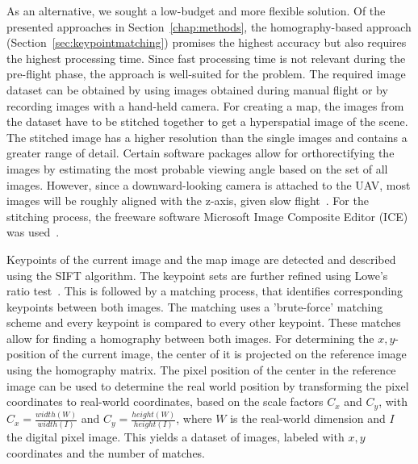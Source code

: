 \documentclass{report}
\begin{document}
As an alternative, we sought a low-budget and more flexible
solution. Of the presented approaches in Section~\ref{chap:methods},
the homography-based approach (Section~\ref{sec:keypointmatching})
promises the highest accuracy but also requires the highest processing
time. Since fast processing time is not relevant during the pre-flight
phase, the approach is well-suited for the problem.
The required image dataset can be obtained by using images obtained
during manual flight or by recording images with a hand-held
camera. For creating a map, the images from the dataset have to be
stitched together to get a hyperspatial image of the scene. The
stitched image has a higher resolution than the single images and
contains a greater range of detail.  Certain software packages allow
for orthorectifying the images by estimating the most probable viewing
angle based on the set of all images. However, since a
downward-looking camera is attached to the UAV, most images will be
roughly aligned with the z-axis, given slow
flight~\cite{blosch2010vision}.  For the stitching process, the
freeware software Microsoft Image Composite Editor (ICE) was
used~\cite{ice}. 

Keypoints of the current image and the map image are detected and
described using the SIFT algorithm. The keypoint sets are further
refined using Lowe's ratio test~\cite{lowe1999object}. This is
followed by a matching process, that identifies corresponding
keypoints between both images. The matching uses a 'brute-force'
matching scheme and every keypoint is compared to every other
keypoint. These matches allow for finding a homography between both
images. For determining the $x, y$-position of the current image, the
center of it is projected on the reference image using the homography
matrix. The pixel position of the center in the reference image can be
used to determine the real world position by transforming the pixel
coordinates to real-world coordinates, based on the scale factors
$C_x$ and $C_y$, with $C_x = \frac{width(W)}{width(I)}$ and
$C_y = \frac{height(W)}{height(I)}$, where $W$ is the real-world
dimension and $I$ the digital pixel image. This yields a dataset of
images, labeled with $x, y$ coordinates and the number of matches.
\end{document}
